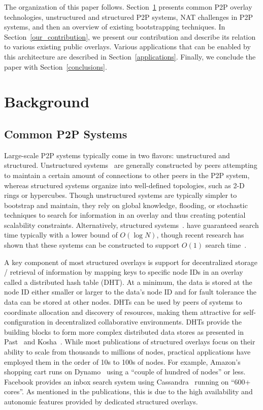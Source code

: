 \documentclass[conference]{IEEEtran}
\begin{document}
The organization of this paper follows.  Section~\ref{background} presents
common P2P overlay technologies, unstructured and structured P2P systems, NAT
challenges in P2P systems, and then an overview of existing bootstrapping
techniques.  In Section~\ref{our_contribution}, we present our contribution and
describe its relation to various existing public overlays.  Various
applications that can be enabled by this architecture are described in
Section~\ref{applications}.  Finally, we conclude the paper with
Section~\ref{conclusions}.

\section{Background}
\label{background}
\subsection{Common P2P Systems}

Large-scale P2P systems typically come in two flavors:  unstructured and
structured.  Unstructured systems~\cite{gnutella, fasttrack} are generally
constructed by peers attempting to maintain a certain amount of connections to
other peers in the P2P system, whereas structured systems organize into
well-defined topologies, such as 2-D rings or hypercubes.  Though unstructured
systems are typically simpler to bootstrap and maintain, they rely on global
knowledge, flooding, or stochastic techniques to search for information in an
overlay and thus creating potential scalability constraints.  Alternatively,
structured systems~\cite{pastry, chord, symphony, kademlia, can}.  have
guaranteed search time typically with a lower bound of $O(\log N)$, though
recent research has shown that these systems can be constructed to support
$O(1)$ search time~\cite{beehive}.  

A key component of most structured overlays is support for decentralized
storage / retrieval of information by mapping keys to specific node IDs in an
overlay called a distributed hash table (DHT).  At a minimum, the data is
stored at the node ID either smaller or larger to the data's node ID and for
fault tolerance the data can be stored at other nodes.  DHTs can be used by
peers of systems to coordinate allocation and discovery of resources, making
them attractive for self-configuration in decentralized collaborative
environments.  DHTs provide the building blocks to form more complex
distributed data stores as presented in Past~\cite{past} and
Kosha~\cite{kosha}.  While most publications of structured overlays focus on
their ability to scale from thousands to millions of nodes, practical
applications have employed them in the order of 10s to 100s of nodes.  For
example, Amazon's shopping cart runs on Dynamo~\cite{dynamo} using a ``couple
of hundred of nodes'' or less.  Facebook provides an inbox search system using
Cassandra~\cite{cassandra} running on ``600+ cores''.  As mentioned in the
publications, this is due to the high availability and autonomic features
provided by dedicated structured overlays.
\end{document}
